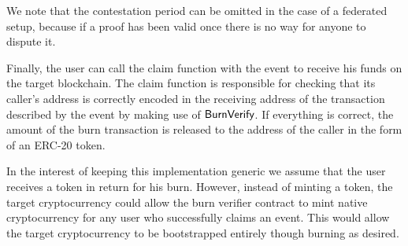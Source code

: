 We note that the contestation period can be omitted in the case of a federated setup, because if a proof has been valid once there is no way for anyone to dispute it.

Finally, the user can call the \textsf{claim} function with the event to receive his funds on the target blockchain. The \textsf{claim} function is responsible for checking that its caller's address is correctly encoded in the receiving address of the transaction described by the event by making use of $\mathsf{BurnVerify}$. If everything is correct, the amount of the burn transaction is released to the address of the caller in the form of an ERC-20 token.

In the interest of keeping this implementation generic we assume that the user receives a token in return for his burn. However, instead of minting a token, the target cryptocurrency could allow the burn verifier contract to mint native cryptocurrency for any user who successfully claims an event. This would allow the target cryptocurrency to be bootstrapped entirely though burning as desired.
